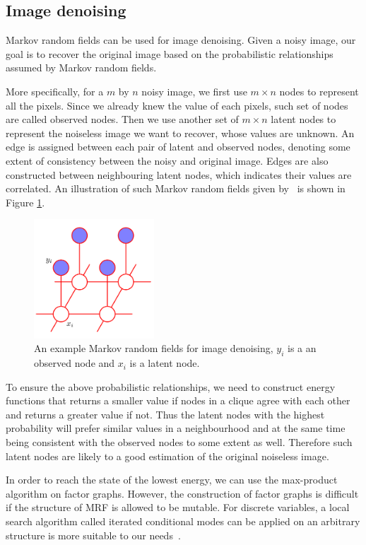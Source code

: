 \subsection{Image denoising}
\label{sec:Image denoising}
Markov random fields can be used for image denoising. Given a noisy image, our goal is to recover the original image based on the probabilistic relationships assumed by Markov random fields. 

More specifically, for a $m$ by $n$ noisy image, we first use $m\times n$ nodes to represent all the pixels. Since we already knew the value of  each pixels, such set of nodes are called observed nodes. Then we use another set of $m\times n$ latent nodes to represent the noiseless image we want to recover, whose values are unknown. An edge is assigned between each pair of latent and observed nodes, denoting some extent of consistency between the noisy and original image. Edges are also constructed between neighbouring latent nodes, which indicates their values are correlated. An illustration of such Markov random fields given by~\cite{bishop2006pattern} is shown in Figure \ref{mrffig}.

\begin{figure}[h!]
  \centering
  \label{mrffig}
  \includegraphics[width=0.4\textwidth]{pics/mrf.png}
  \caption{ An example Markov random fields for image denoising, $y_i$ is a an observed node and $x_i$ is a latent node.}
\end{figure}

To ensure the above probabilistic relationships, we need to construct energy functions that returns a smaller value if nodes in a clique agree with each other and returns a greater value if not. Thus the latent nodes with the highest probability will prefer similar values in a neighbourhood and at the same time being consistent with the observed nodes to some extent as well. Therefore such latent nodes are likely to a good estimation of the original noiseless image.
 
In order to reach the state of the lowest energy, we can use the max-product algorithm on factor graphs. However, the construction of factor graphs is difficult if the structure of MRF is allowed to be mutable. For discrete variables, a local search algorithm called iterated conditional modes can be applied on an arbitrary structure is more suitable to our needs~\cite{kittler1984contextual}.

